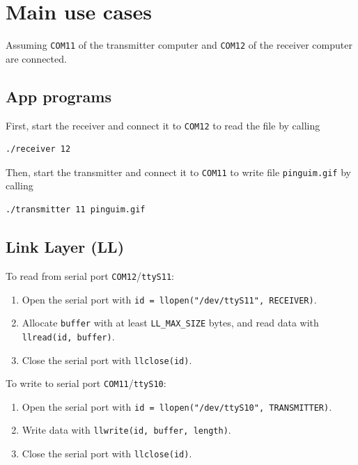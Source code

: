 \documentclass[a4paper, 11pt]{report}
\begin{document}
\section{Main use cases} \label{sec:UseCases}

Assuming \texttt{COM11} of the transmitter computer and \texttt{COM12} of the receiver computer are connected.

\subsection{App programs}

First, start the receiver and connect it to \texttt{COM12} to read the file by calling

\begin{lstlisting}[frame=none, numbers=none]
./receiver 12
\end{lstlisting}
Then, start the transmitter and connect it to \texttt{COM11} to write file \texttt{pinguim.gif} by calling

\begin{lstlisting}[frame=none, numbers=none]
./transmitter 11 pinguim.gif
\end{lstlisting}
	
\subsection{Link Layer (LL)}

To read from serial port \texttt{COM12}/\texttt{ttyS11}:
\begin{enumerate}
	\itemsep0em
	\item Open the serial port with \texttt{id = llopen("/dev/ttyS11", RECEIVER)}.
	\item Allocate \texttt{buffer} with at least \texttt{LL\_MAX\_SIZE} bytes, and read data with \texttt{llread(id, buffer)}.
	\item Close the serial port with \texttt{llclose(id)}.
\end{enumerate}
To write to serial port \texttt{COM11}/\texttt{ttyS10}:
\begin{enumerate}
	\itemsep0em
	\item Open the serial port with \texttt{id = llopen("/dev/ttyS10", TRANSMITTER)}.
	\item Write data with \texttt{llwrite(id, buffer, length)}.
	\item Close the serial port with \texttt{llclose(id)}.
\end{enumerate}
\end{document}
